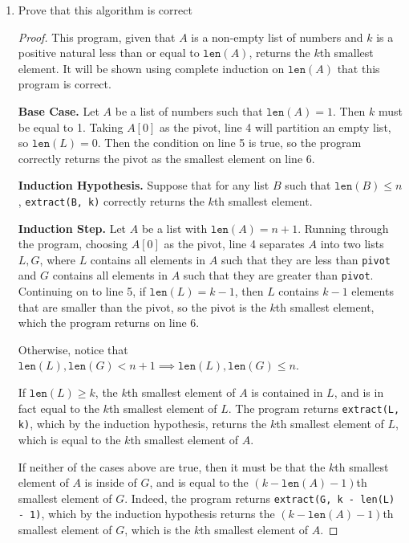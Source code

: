 \documentclass[11pt]{article}
\begin{document}
    \begin{enumerate}[label=(\alph*)]
        \item Prove that this algorithm is correct
        
        \begin{proof}
            This program, given that \(A\) is a non-empty list of numbers and \(k\) is a positive natural less than or equal to \(\texttt{len}(A)\), returns the \(k\)th smallest element. It will be shown using complete induction on \(\texttt{len}(A)\) that this program is correct.

            \textbf{Base Case.} Let \(A\) be a list of numbers such that \(\texttt{len}(A) = 1\). Then \(k\) must be equal to 1. Taking \(A[0]\) as the pivot, line 4 will partition an empty list, so \(\texttt{len}(L) = 0\). Then the condition on line 5 is true, so the program correctly returns the pivot as the smallest element on line 6.

            \textbf{Induction Hypothesis.} Suppose that for any list \(B\) such that \(\texttt{len}(B) \leq n\), \verb|extract(B, k)| correctly returns the \(k\)th smallest element.

            \textbf{Induction Step.} Let \(A\) be a list with \(\texttt{len}(A) = n + 1\). Running through the program, choosing \(A[0]\) as the pivot, line 4 separates \(A\) into two lists \(L,G\), where \(L\) contains all elements in \(A\) such that they are less than \texttt{pivot} and \(G\) contains all elements in \(A\) such that they are greater than \texttt{pivot}. Continuing on to line 5, if \(\texttt{len}(L) = k - 1\), then \(L\) contains \(k-1\) elements that are smaller than the pivot, so the pivot is the \(k\)th smallest element, which the program returns on line 6.

            Otherwise, notice that \(\texttt{len}(L),\texttt{len}(G) < n+1 \implies \texttt{len}(L),\texttt{len}(G) \leq n\).
            
            If \(\texttt{len}(L) \geq k\), the \(k\)th smallest element of \(A\) is contained in \(L\), and is in fact equal to the \(k\)th smallest element of \(L\). The program returns \verb|extract(L, k)|, which by the induction hypothesis, returns the \(k\)th smallest element of \(L\), which is equal to the \(k\)th smallest element of \(A\).

            If neither of the cases above are true, then it must be that the \(k\)th smallest element of \(A\) is inside of \(G\), and is equal to the \((k - \texttt{len}(A) - 1)\)th smallest element of \(G\). Indeed, the program returns \verb|extract(G, k - len(L) - 1)|, which by the induction hypothesis returns the \((k - \texttt{len}(A) - 1)\)th smallest element of \(G\), which is the \(k\)th smallest element of \(A\).


\end{proof}
\end{enumerate}
\end{document}
